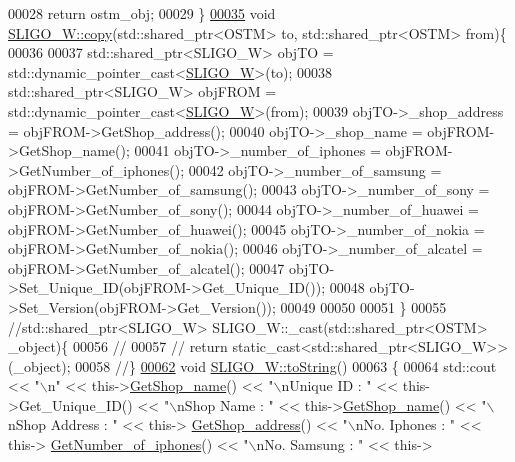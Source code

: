 \begin{DoxyCode}
00028     \textcolor{keywordflow}{return} ostm\_obj;
00029 \}
\hypertarget{_s_l_i_g_o___w_8cpp_source.tex_l00035}{}\hyperlink{class_s_l_i_g_o___w_acd5ae7347e6ca94c52eb013e07a66116}{00035} \textcolor{keywordtype}{void} \hyperlink{class_s_l_i_g_o___w_acd5ae7347e6ca94c52eb013e07a66116}{SLIGO\_W::copy}(std::shared\_ptr<OSTM> to, std::shared\_ptr<OSTM> from)\{
00036 
00037     std::shared\_ptr<SLIGO\_W> objTO = std::dynamic\_pointer\_cast<\hyperlink{class_s_l_i_g_o___w}{SLIGO\_W}>(to);
00038     std::shared\_ptr<SLIGO\_W> objFROM = std::dynamic\_pointer\_cast<\hyperlink{class_s_l_i_g_o___w}{SLIGO\_W}>(from);
00039     objTO->\_shop\_address = objFROM->GetShop\_address();
00040     objTO->\_shop\_name = objFROM->GetShop\_name();
00041     objTO->\_number\_of\_iphones = objFROM->GetNumber\_of\_iphones();
00042     objTO->\_number\_of\_samsung = objFROM->GetNumber\_of\_samsung();
00043     objTO->\_number\_of\_sony = objFROM->GetNumber\_of\_sony();
00044     objTO->\_number\_of\_huawei = objFROM->GetNumber\_of\_huawei();
00045     objTO->\_number\_of\_nokia = objFROM->GetNumber\_of\_nokia();
00046     objTO->\_number\_of\_alcatel = objFROM->GetNumber\_of\_alcatel();
00047     objTO->Set\_Unique\_ID(objFROM->Get\_Unique\_ID());
00048     objTO->Set\_Version(objFROM->Get\_Version());
00049     
00050    
00051 \}
00055 \textcolor{comment}{//std::shared\_ptr<SLIGO\_W> SLIGO\_W::\_cast(std::shared\_ptr<OSTM> \_object)\{}
00056 \textcolor{comment}{//    }
00057 \textcolor{comment}{//    return static\_cast<std::shared\_ptr<SLIGO\_W>>(\_object);}
00058 \textcolor{comment}{//\}}
\hypertarget{_s_l_i_g_o___w_8cpp_source.tex_l00062}{}\hyperlink{class_s_l_i_g_o___w_a8f49deaa85f48ff29dd8cdeb7c9dda56}{00062} \textcolor{comment}{}\textcolor{keywordtype}{void} \hyperlink{class_s_l_i_g_o___w_a8f49deaa85f48ff29dd8cdeb7c9dda56}{SLIGO\_W::toString}()
00063 \{
00064     std::cout << \textcolor{stringliteral}{"\(\backslash\)n"} <<  this->\hyperlink{class_s_l_i_g_o___w_ae788518e30d9d311eb28f37da932367a}{GetShop\_name}() << \textcolor{stringliteral}{"\(\backslash\)nUnique ID : "} << this->Get\_Unique\_ID() << \textcolor{stringliteral}{
      "\(\backslash\)nShop Name : "}  << this->\hyperlink{class_s_l_i_g_o___w_ae788518e30d9d311eb28f37da932367a}{GetShop\_name}() << \textcolor{stringliteral}{"\(\backslash\)nShop Address : "} << this->
      \hyperlink{class_s_l_i_g_o___w_a66a2315d531231e34c5056e9bc917797}{GetShop\_address}() << \textcolor{stringliteral}{"\(\backslash\)nNo. Iphones : "} << this->
      \hyperlink{class_s_l_i_g_o___w_a780b3a690f5cbbf7593ffc6612b3d743}{GetNumber\_of\_iphones}() << \textcolor{stringliteral}{"\(\backslash\)nNo. Samsung : "} << this->

\end{DoxyCode}
